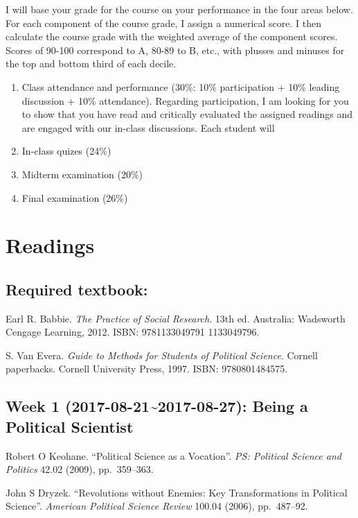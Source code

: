 \documentclass[11pt,]{article}
\begin{document}
I will base your grade for the course on your performance in the four
areas below. For each component of the course grade, I assign a
numerical score. I then calculate the course grade with the weighted
average of the component scores. Scores of 90-100 correspond to A, 80-89
to B, etc., with plusses and minuses for the top and bottom third of
each decile.

\begin{enumerate}
\def\labelenumi{\arabic{enumi}.}
\item
  Class attendance and performance (30\%: 10\% participation + 10\%
  leading discussion + 10\% attendance). Regarding participation, I am
  looking for you to show that you have read and critically evaluated
  the assigned readings and are engaged with our in-class discussions.
  Each student will
\item
  In-class quizes (24\%)
\item
  Midterm examination (20\%)
\item
  Final examination (26\%)
\end{enumerate}

\section{Readings}\label{readings}

\subsection{Required textbook:}\label{required-textbook}

Earl R. Babbie. \emph{The Practice of Social Research}. 13th ed.
Australia: Wadsworth Cengage Learning, 2012. ISBN: 9781133049791
1133049796.

S. Van Evera. \emph{Guide to Methods for Students of Political Science}.
Cornell paperbacks. Cornell University Press, 1997. ISBN: 9780801484575.

\subsection{Week 1 (2017-08-21\textasciitilde{}2017-08-27): Being a
Political
Scientist}\label{week-1-2017-08-212017-08-27-being-a-political-scientist}

Robert O Keohane. ``Political Science as a Vocation''.
\emph{PS: Political Science and Politics} 42.02 (2009), pp.~359--363.

John S Dryzek. ``Revolutions without Enemies: Key Transformations in
Political Science''. \emph{American Political Science Review} 100.04
(2006), pp.~487--92.
\end{document}
